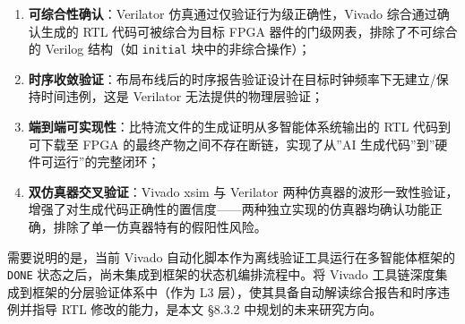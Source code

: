 \begin{enumerate}
\def\labelenumi{\arabic{enumi}.}
\tightlist
\item
  \textbf{可综合性确认}：Verilator 仿真通过仅验证行为级正确性，Vivado
  综合通过确认生成的 RTL 代码可被综合为目标 FPGA
  器件的门级网表，排除了不可综合的 Verilog 结构（如 \texttt{initial}
  块中的非综合操作）；
\item
  \textbf{时序收敛验证}：布局布线后的时序报告验证设计在目标时钟频率下无建立/保持时间违例，这是
  Verilator 无法提供的物理层验证；
\item
  \textbf{端到端可实现性}：比特流文件的生成证明从多智能体系统输出的 RTL
  代码到可下载至 FPGA
  的最终产物之间不存在断链，实现了从''AI
  生成代码''到''硬件可运行''的完整闭环；
\item
  \textbf{双仿真器交叉验证}：Vivado xsim 与 Verilator
  两种仿真器的波形一致性验证，增强了对生成代码正确性的置信度------两种独立实现的仿真器均确认功能正确，排除了单一仿真器特有的假阳性风险。
\end{enumerate}

需要说明的是，当前 Vivado 自动化脚本作为离线验证工具运行在多智能体框架的
\texttt{DONE} 状态之后，尚未集成到框架的状态机编排流程中。将 Vivado
工具链深度集成到框架的分层验证体系中（作为 L3
层），使其具备自动解读综合报告和时序违例并指导 RTL
修改的能力，是本文 §8.3.2 中规划的未来研究方向。
